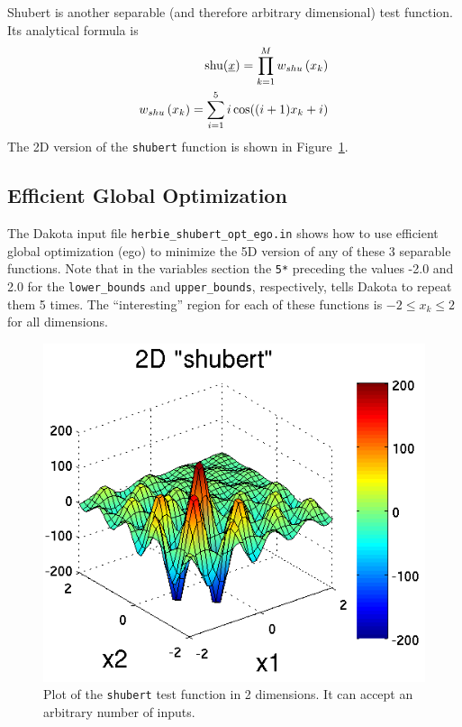 Shubert is another separable (and therefore arbitrary dimensional) 
test function. Its analytical formula is
\begin{eqnarray*}
{\rm shu}(\underline{x})= \prod_{k=1}^M w_{shu}\left(x_k\right) \\
w_{shu}\left(x_k\right)= \sum_{i=1}^5 i\cos((i+1)x_k+i)
\end{eqnarray*}
The 2D version of the \texttt{shubert} function is shown in 
Figure~\ref{fig:2D_shubert}. 

\subsection{Efficient Global Optimization}

The Dakota input file \texttt{herbie\_shubert\_opt\_ego.in} shows how
to use efficient global optimization (ego) to minimize the 5D version
of any of these 3 separable functions. Note that in the variables
section the \texttt{5*} preceding the values -2.0 and 2.0 for the
\texttt{lower\_bounds} and \texttt{upper\_bounds}, respectively, tells
Dakota to repeat them 5 times. The ``interesting'' region for each 
of these functions is $-2\le x_k \le 2$ for all dimensions.
\begin{center}
  \begin{small}
    \begin{bigbox}
    \end{bigbox}
  \end{small}
\end{center}

\begin{figure}
  \centering
  \centerline{\includegraphics[scale=1.0]{images/DAK5pt2_2D_shubert}}
  \caption{Plot of the \texttt{shubert} test function in 2 dimensions.
           It can accept an arbitrary number of inputs.}
  \label{fig:2D_shubert}
\end{figure}

